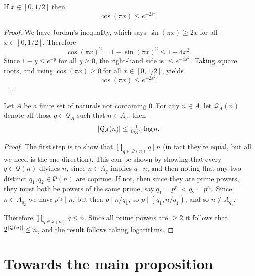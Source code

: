\begin{lemma}\label{lem:cos_bound}
  \leanok
If $x\in [0,1/2]$ then
\[\cos(\pi x) \leq e^{-2x^2}.\]
\end{lemma}
\begin{proof}
  \leanok
We have Jordan's inequality, which says $\sin(\pi x)\geq 2x$ for all $x\in[0,1/2]$. Therefore
\[\cos(\pi x)^2 = 1-\sin(\pi x)^2\leq 1-4x^2.\]
Since $1-y\leq e^{-y}$ for all $y\geq 0$, the right-hand side is $\leq e^{-4x^2}$. Taking square roots, and using $\cos(\pi x)\geq 0$ for all $x\in[0,1/2]$, yields
\[\cos(\pi x) \leq e^{-2x^2}.\]
\end{proof}

\begin{lemma}\label{lem:triv_q_bound}
  \leanok
Let $A$ be a finite set of naturals not containing $0$. For any $n\in A$, let $\mathcal{Q}_A(n)$ denote all those $q\in \mathcal{Q}_A$ such that $n\in A_q$, then
\[\left\lvert \mathcal{Q}_A(n)\right\rvert\leq  \tfrac{1}{\log 2}\log n.\]
\end{lemma}
\begin{proof}
  \leanok
The first step is to show that $\prod_{q\in\mathcal{Q}(n)}q\mid n$ (in fact they're equal, but all we need is the one direction). This can be shown by showing that every $q\in\mathcal{Q}(n)$ divides $n$, since $n\in A_q$ implies $q\mid n$,  and then noting that any two distinct $q_1,q_2\in \mathcal{Q}(n)$ are coprime. If not, then since they are prime powers, they must both be powers of the same prime, say $q_1=p^{r_1}< q_2=p^{r_2}$. Since $n\in A_{q_2}$ we have $p^{r_2}\mid n$, but then $p\mid n/q_1$, so $p\mid (q_1,n/q_1)$, and so $n\not\in A_{q_1}$.

Therefore $\prod_{q\in\mathcal{Q}(n)}q\leq n$. Since all prime powers are $\geq 2$ it follows that $2^{\left\lvert \mathcal{Q}(n)\right\rvert}\leq n$, and the result follows taking logarithms.
\end{proof}

\section{Towards the main proposition}

